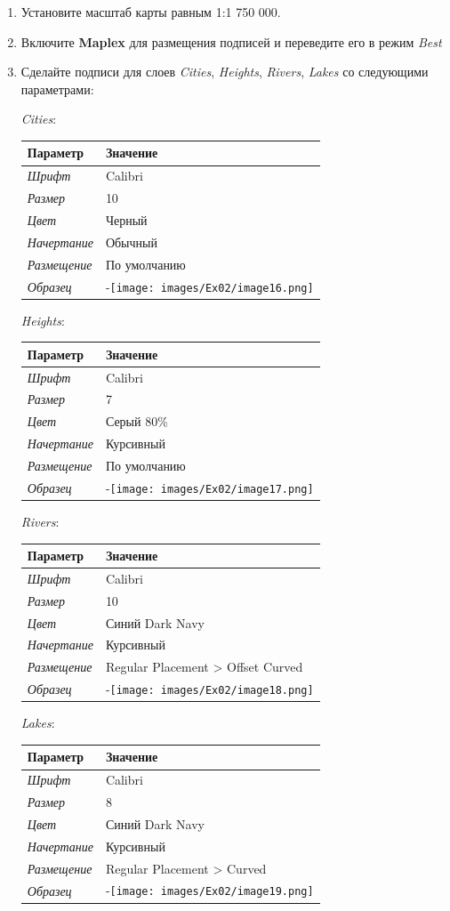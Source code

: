 \documentclass[12pt,]{book}
\begin{document}
\begin{enumerate}
\def\labelenumi{\arabic{enumi}.}
\item
  Установите масштаб карты равным 1:1 750 000.
\item
  Включите \textbf{Maplex} для размещения подписей и переведите его в режим \emph{Best}
\item
  Сделайте подписи для слоев \emph{Cities}, \emph{Heights}, \emph{Rivers}, \emph{Lakes} со следующими параметрами:

  \emph{Cities}:

  \begin{longtable}[]{@{}ll@{}}
  \toprule
  Параметр & Значение\tabularnewline
  \midrule
  \endhead
  \emph{Шрифт} & Calibri\tabularnewline
  \emph{Размер} & 10\tabularnewline
  \emph{Цвет} & Черный\tabularnewline
  \emph{Начертание} & Обычный\tabularnewline
  \emph{Размещение} & По умолчанию\tabularnewline
  \emph{Образец} & -\texttt{[image: images/Ex02/image16.png]}\tabularnewline
  \bottomrule
  \end{longtable}

  \emph{Heights}:

  \begin{longtable}[]{@{}ll@{}}
  \toprule
  Параметр & Значение\tabularnewline
  \midrule
  \endhead
  \emph{Шрифт} & Calibri\tabularnewline
  \emph{Размер} & 7\tabularnewline
  \emph{Цвет} & Серый 80\%\tabularnewline
  \emph{Начертание} & Курсивный\tabularnewline
  \emph{Размещение} & По умолчанию\tabularnewline
  \emph{Образец} & -\texttt{[image: images/Ex02/image17.png]}\tabularnewline
  \bottomrule
  \end{longtable}

  \emph{Rivers}:

  \begin{longtable}[]{@{}ll@{}}
  \toprule
  Параметр & Значение\tabularnewline
  \midrule
  \endhead
  \emph{Шрифт} & Calibri\tabularnewline
  \emph{Размер} & 10\tabularnewline
  \emph{Цвет} & Синий Dark Navy\tabularnewline
  \emph{Начертание} & Курсивный\tabularnewline
  \emph{Размещение} & Regular Placement \textgreater{} Offset Curved\tabularnewline
  \emph{Образец} & -\texttt{[image: images/Ex02/image18.png]}\tabularnewline
  \bottomrule
  \end{longtable}

  \emph{Lakes}:

  \begin{longtable}[]{@{}ll@{}}
  \toprule
  Параметр & Значение\tabularnewline
  \midrule
  \endhead
  \emph{Шрифт} & Calibri\tabularnewline
  \emph{Размер} & 8\tabularnewline
  \emph{Цвет} & Синий Dark Navy\tabularnewline
  \emph{Начертание} & Курсивный\tabularnewline
  \emph{Размещение} & Regular Placement \textgreater{} Curved\tabularnewline
  \emph{Образец} & -\texttt{[image: images/Ex02/image19.png]}\tabularnewline
  \bottomrule
  \end{longtable}
\end{enumerate}
\end{document}
